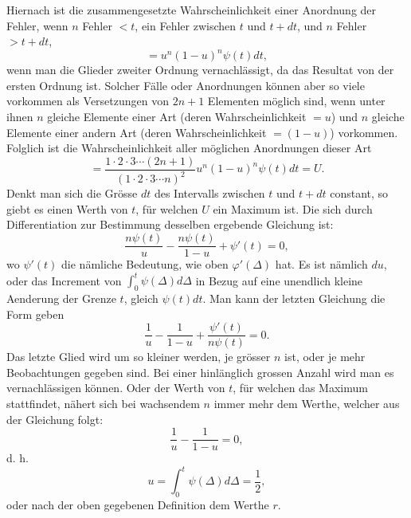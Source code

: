 \documentclass[11pt]{article}
\begin{document}
Hiernach ist die zusammengesetzte Wahrscheinlichkeit einer Anordnung der Fehler, wenn $n$ Fehler $<t$, ein Fehler zwischen $t$ und $t+dt$, und $n$ Fehler $>t+dt$,
\[
 =u^n(1-u)^n\psi(t)dt,
\]
wenn man die Glieder zweiter Ordnung vernachlässigt, da das Resultat von der ersten Ordnung ist. Solcher Fälle oder Anordnungen können aber so viele vorkommen als Versetzungen von $2n+1$ Elementen möglich sind, wenn unter ihnen $n$ gleiche Elemente einer Art (deren Wahrscheinlichkeit $=u$) und $n$ gleiche Elemente einer andern Art (deren Wahrscheinlichkeit $=(1-u)$) vorkommen. Folglich ist die Wahrscheinlichkeit aller möglichen Anordnungen dieser Art
\[
 =\frac{1\cdot2\cdot3\cdots(2n+1)}{(1\cdot2\cdot3\cdots n)^2}u^n(1-u)^n\psi(t)dt=U.
\]
Denkt man sich die Grösse $dt$ des Intervalls zwischen $t$ und $t+dt$ constant, so giebt es einen Werth von $t$, für welchen $U$ ein Maximum ist. Die sich durch Differentiation zur Bestimmung desselben ergebende Gleichung ist:
\[
 \frac{n\psi(t)}{u}-\frac{n\psi(t)}{1-u}+\psi'(t)=0,
\]
wo $\psi'(t)$ die nämliche Bedeutung, wie oben $\varphi'(\Delta)$ hat. Es ist nämlich $du$, oder das Increment von $\int_0^t\psi(\Delta)d\Delta$ in Bezug auf eine unendlich kleine Aenderung der Grenze $t$, gleich $\psi(t)dt$. Man kann der letzten Gleichung die Form geben
\[
 \frac1u-\frac1{1-u}+\frac{\psi'(t)}{n\psi(t)}=0.
\]
Das letzte Glied wird um so kleiner werden, je grösser $n$ ist, oder je mehr Beobachtungen gegeben sind. Bei einer hinlänglich grossen Anzahl wird man es vernachlässigen können. Oder der Werth von $t$, für welchen das Maximum stattfindet, nähert sich bei wachsendem $n$ immer mehr dem Werthe, welcher aus der Gleichung folgt:
\[
 \frac1u-\frac1{1-u}=0,
\]
d. h.
\[
 u=\int_0^t\psi(\Delta)d\Delta=\frac12,
\]
oder nach der oben gegebenen Definition dem Werthe $r$.
\end{document}
